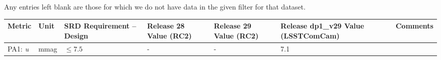 \documentclass[DM,toc,lsstdraft]{lsstdoc}
\begin{document}
Any entries left blank are those for which we do not have data in the given filter for that dataset.

\begin{longtable}[]{@{}lllllll@{}}
\toprule
\begin{minipage}[b]{0.12\columnwidth}\raggedright\strut
Metric\strut
\end{minipage} & \begin{minipage}[b]{0.06\columnwidth}\raggedright\strut
Unit\strut
\end{minipage} & \begin{minipage}[b]{0.14\columnwidth}\raggedright\strut
SRD Requirement -- Design\strut
\end{minipage} & \begin{minipage}[b]{0.12\columnwidth}\raggedright\strut
Release 28 Value (RC2) \strut
\end{minipage} & \begin{minipage}[b]{0.12\columnwidth}\raggedright\strut
Release 29 Value (RC2) \strut
\end{minipage} & \begin{minipage}[b]{0.12\columnwidth}\raggedright\strut
Release dp1\_v29 Value (LSSTComCam) \strut
\end{minipage} & \begin{minipage}[b]{0.17\columnwidth}\raggedright\strut
Comments\strut
\end{minipage}\tabularnewline
\midrule
\endhead
\begin{minipage}[t]{0.12\columnwidth}\raggedright\strut
PA1: \emph{u}\strut
\end{minipage} & \begin{minipage}[t]{0.06\columnwidth}\raggedright\strut
mmag\strut
\end{minipage} & \begin{minipage}[t]{0.14\columnwidth}\raggedright\strut
\(\leq 7.5\)\strut
\end{minipage} & \begin{minipage}[t]{0.12\columnwidth}\raggedright\strut
- \strut
\end{minipage} & \begin{minipage}[t]{0.12\columnwidth}\raggedright\strut
- \strut
\end{minipage} & \begin{minipage}[t]{0.12\columnwidth}\raggedright\strut
7.1 \strut
\end{minipage} & \begin{minipage}[t]{0.17\columnwidth}\raggedright\strut


\end{minipage}
\end{longtable}
\end{document}
